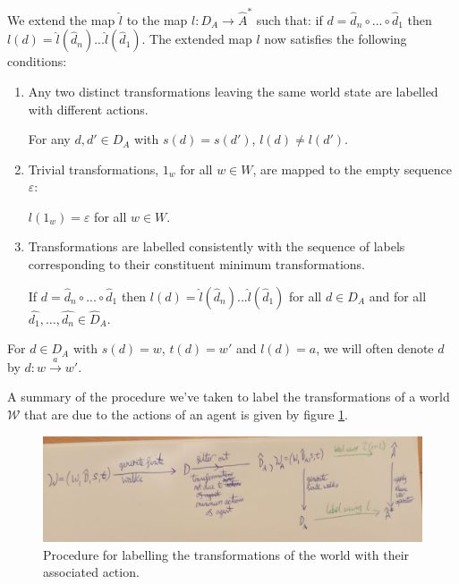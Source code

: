 We extend the map $\hat{l}$ to the map $l: D_{A} \to \hat{A}^{\ast}$ such that:
if $d = \hat{d}_{n} \circ ... \circ \hat{d}_{1}$ then $l(d) = \hat{l}(\hat{d}_{n}) ... \hat{l}(\hat{d}_{1})$.
The extended map $l$ now satisfies the following conditions:
\begin{enumerate}
	\item Any two distinct transformations leaving the same world state are
	      labelled with different actions.
	      \begin{action_condition}[Uniqueness]\label{actcon:action_gives_single_outcome}
		      For any $d,d' \in D_{A}$ with $s(d)=s(d')$, $l(d) \neq l(d')$.
	      \end{action_condition}

	\item Trivial transformations, $1_{w}$ for all $w \in W$, are mapped to the empty sequence $\varepsilon$:
	      \begin{action_condition}[Identity]\label{actcon:trivial_transformations_mapped_to_empty_sequence}
		      $l(1_{w}) = \varepsilon$ for all $w \in W$.
	      \end{action_condition}

	\item Transformations are labelled consistently with the sequence of labels corresponding to their constituent minimum transformations.
	      \begin{action_condition}\label{actcon:composition_consistency}
		      If $d = \hat{d}_{n} \circ ... \circ \hat{d}_{1}$ then $l(d) = \hat{l}(\hat{d}_{n}) ... \hat{l}(\hat{d}_{1})$ for all $d \in D_{A}$ and for all $\hat{d_{1}}, \dots , \hat{d_{n}} \in \hat{D}_{A}$.
	      \end{action_condition}
\end{enumerate}

For $d \in D_{A}$ with $s(d) = w$, $t(d) = w'$ and $l(d) = a$, we will often denote $d$ by $d: w \xrightarrow{a} w'$.

A summary of the procedure we've taken to label the transformations of a world $\mathscr{W}$ that are due to the actions of an agent is given by figure \ref{fig:action_labelling_procedure}.

\begin{figure}
	\centering
	\includegraphics[width=\linewidth]{2MathematicalFramework/Images/action_labelling_procedure.jpeg}
	\caption{Procedure for labelling the transformations of the world with their associated action.}
	\label{fig:action_labelling_procedure}
\end{figure}


